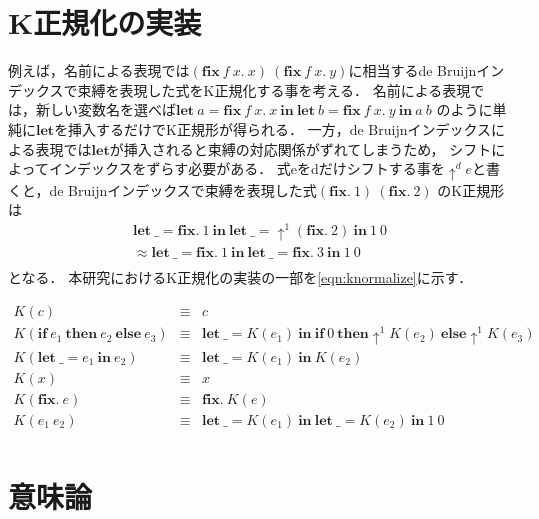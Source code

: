 \documentclass[T]{compsoft}
\newcommand{\keyword}[1]{\mathbf{#1}}
\newcommand{\IF}{\keyword{if}}
\newcommand{\THEN}{\keyword{then}}
\newcommand{\ELSE}{\keyword{else}}
\newcommand{\LET}{\keyword{let}}
\newcommand{\FIX}{\keyword{fix}}
\newcommand{\IN}{\keyword{in}}
\begin{document}
\section{K正規化の実装}
例えば，名前による表現では$(\FIX~f~x.~x)~(\FIX~f~x.~y)$に相当するde Bruijnインデックスで束縛を表現した式をK正規化する事を考える．
名前による表現では，新しい変数名を選べば$\LET~a = \FIX~f~x.~x~\IN~\LET~b = \FIX~f~x.~y~\IN~a~b$
のように単純に$\LET$を挿入するだけでK正規形が得られる．
一方，de Bruijnインデックスによる表現では$\LET$が挿入されると束縛の対応関係がずれてしまうため，
シフトによってインデックスをずらす必要がある．
式eをdだけシフトする事を$\uparrow^d e$と書くと，de Bruijnインデックスで束縛を表現した式$(\FIX.~1)~(\FIX.~2)$
のK正規形は
\[ 
	\begin{array}{l}
		\LET~\_ = \FIX.~1~\IN~\LET~\_ = \uparrow^1(\FIX.~2)~\IN~1~0 \\
		\approx \LET~\_ = \FIX.~1~\IN~\LET~\_ = \FIX.~3~\IN~1~0 \\
	\end{array}
\]
となる．
本研究におけるK正規化の実装の一部を\figurename\ref{eqn:knormalize}に示す．
\begin{figure*}[htbp]
	\[\begin{array}{rcl}
		K(c) & \equiv & c \\
		K(\IF~e_1~\THEN~e_2~\ELSE~e_3) & \equiv & \LET~\_ = K(e_1)~\IN~\IF~0~\THEN\uparrow^1 K(e_2)~\ELSE\uparrow^1 K(e_3) \\
		K(\LET~\_ = e_1~\IN~e_2) & \equiv & \LET~\_=K(e_1)~\IN~K(e_2) \\ 
		K(x) & \equiv & x \\
		K(\FIX.~e) & \equiv & \FIX.~K(e) \\
		K(e_1~e_2) & \equiv & \LET~\_ = K(e_1)~\IN~\LET~\_ = K(e_2)~\IN~1~0 \\
	\end{array}\]
	\caption{K正規化の実装の一部}
	\label{eqn:knormalize}
\end{figure*}

\section{意味論}\label{section:semantics}
\end{document}
